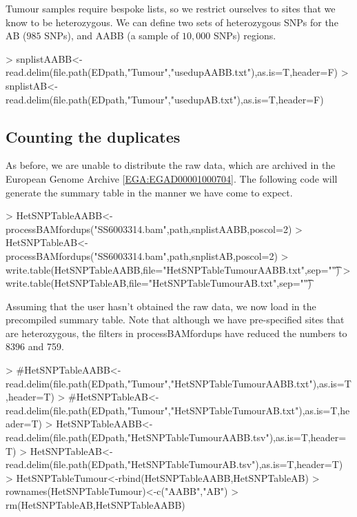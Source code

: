 \documentclass{article}
\begin{document}
Tumour samples require bespoke lists, so we restrict ourselves to sites that we know to be heterozygous. We can define two sets of heterozygous SNPs for the AB ($985$ SNPs), and AABB (a sample of $10,000$ SNPs)  regions. 

\begin{Schunk}
\begin{Sinput}
> snplistAABB<-read.delim(file.path(EDpath,"Tumour","usedupAABB.txt"),as.is=T,header=F)
> snplistAB<-read.delim(file.path(EDpath,"Tumour","usedupAB.txt"),as.is=T,header=F)
\end{Sinput}
\end{Schunk}


\subsection{Counting the duplicates}

As before, we are unable to distribute the raw data, which are archived in the European Genome Archive [\href{https://www.ebi.ac.uk/ega/datasets/EGAD00001000704}{EGA:EGAD00001000704}]. The following code will generate the summary table in the manner we have come to expect.

\begin{Schunk}
\begin{Sinput}
> HetSNPTableAABB<-processBAMfordups("SS6003314.bam",path,snplistAABB,poscol=2)
> HetSNPTableAB<-processBAMfordups("SS6003314.bam",path,snplistAB,poscol=2)
> write.table(HetSNPTableAABB,file="HetSNPTableTumourAABB.txt",sep="\t")
> write.table(HetSNPTableAB,file="HetSNPTableTumourAB.txt",sep="\t")
\end{Sinput}
\end{Schunk}

Assuming that the user hasn't obtained the raw data, we now load in the precompiled summary table. Note that although we have pre-specified sites that are heterozygous, the filters in processBAMfordups have reduced the numbers to 8396 and 759.

\begin{Schunk}
\begin{Sinput}
> #HetSNPTableAABB<-read.delim(file.path(EDpath,"Tumour","HetSNPTableTumourAABB.txt"),as.is=T,header=T)
> #HetSNPTableAB<-read.delim(file.path(EDpath,"Tumour","HetSNPTableTumourAB.txt"),as.is=T,header=T)
> HetSNPTableAABB<-read.delim(file.path(EDpath,"HetSNPTableTumourAABB.tsv"),as.is=T,header=T)
> HetSNPTableAB<-read.delim(file.path(EDpath,"HetSNPTableTumourAB.tsv"),as.is=T,header=T)
> HetSNPTableTumour<-rbind(HetSNPTableAABB,HetSNPTableAB)
> rownames(HetSNPTableTumour)<-c("AABB","AB")
> rm(HetSNPTableAB,HetSNPTableAABB)
\end{Sinput}
\end{Schunk}
\end{document}
